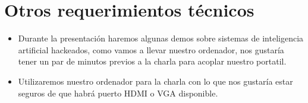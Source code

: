 \documentclass[runningheads]{llncs}
\begin{document}
\section{Otros requerimientos t\'ecnicos}
\begin{itemize}
 \item Durante la presentación haremos algunas demos sobre sistemas de inteligencia artificial hackeados, como vamos a llevar nuestro ordenador, nos gustaría tener un par de minutos previos a la charla para acoplar nuestro portatil.

 \item Utilizaremos nuestro ordenador para la charla con lo que nos gustaría estar seguros de que habrá puerto HDMI o VGA disponible. 
\end{itemize}

\clearpage



\end{document}
